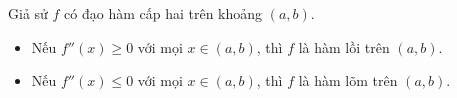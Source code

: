 



\begin{corollary}
\label{cor:second-derivative-concavity-test}
Giả sử $f$ có đạo hàm cấp hai trên khoảng $(a,b)$.
\begin{itemize}
    \item Nếu $f''(x) \ge 0$ với mọi $x \in (a,b)$, thì $f$ là hàm lồi trên $(a,b)$.
    \item Nếu $f''(x) \le 0$ với mọi $x \in (a,b)$, thì $f$ là hàm lõm trên $(a,b)$.
\end{itemize}
\end{corollary}


